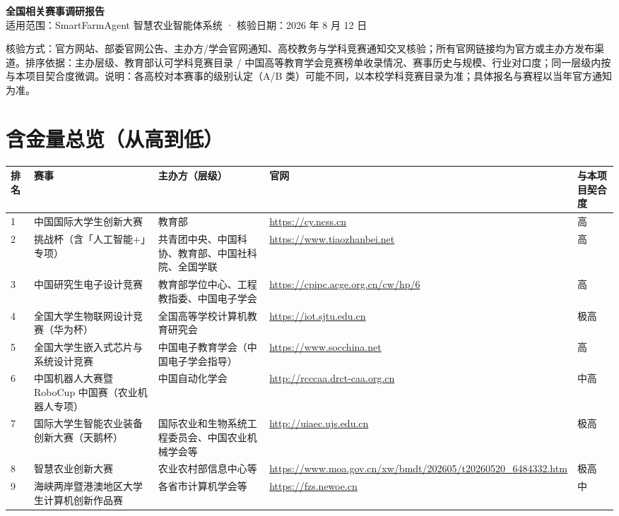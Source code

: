 \documentclass[11pt]{ctexart}
\begin{document}
\begin{center}
  {\LARGE\bfseries 全国相关赛事调研报告}\\[6pt]
  {\normalsize 适用范围：SmartFarmAgent 智慧农业智能体系统 · 核验日期：2026 年 8 月 12 日}
\end{center}

\vspace{0.6em}

核验方式：官方网站、部委官网公告、主办方/学会官网通知、高校教务与学科竞赛通知交叉核验；所有官网链接均为官方或主办方发布渠道。排序依据：主办层级、教育部认可学科竞赛目录 / 中国高等教育学会竞赛榜单收录情况、赛事历史与规模、行业对口度；同一层级内按与本项目契合度微调。说明：各高校对本赛事的级别认定（A/B 类）可能不同，以本校学科竞赛目录为准；具体报名与赛程以当年官方通知为准。

\section{含金量总览（从高到低）}
\begin{small}
\begin{longtable}{p{0.8cm}p{3.6cm}p{3.4cm}p{4.0cm}p{2.8cm}}
  \toprule
  排名 & 赛事 & 主办方（层级） & 官网 & 与本项目契合度 \\
  \midrule
  1 & 中国国际大学生创新大赛 & 教育部 & \url{https://cy.ncss.cn} & 高 \\
  2 & 挑战杯（含「人工智能+」专项） & 共青团中央、中国科协、教育部、中国社科院、全国学联 & \url{https://www.tiaozhanbei.net} & 高 \\
  3 & 中国研究生电子设计竞赛 & 教育部学位中心、工程教指委、中国电子学会 & \url{https://cpipc.acge.org.cn/cw/hp/6} & 高 \\
  4 & 全国大学生物联网设计竞赛（华为杯） & 全国高等学校计算机教育研究会 & \url{https://iot.sjtu.edu.cn} & 极高 \\
  5 & 全国大学生嵌入式芯片与系统设计竞赛 & 中国电子教育学会（中国电子学会指导） & \url{https://www.socchina.net} & 高 \\
  6 & 中国机器人大赛暨 RoboCup 中国赛（农业机器人专项） & 中国自动化学会 & \url{http://rcccaa.drct-caa.org.cn} & 中高 \\
  7 & 国际大学生智能农业装备创新大赛（天鹅杯） & 国际农业和生物系统工程委员会、中国农业机械学会等 & \url{http://uiaec.ujs.edu.cn} & 极高 \\
  8 & 智慧农业创新大赛 & 农业农村部信息中心等 & \url{https://www.moa.gov.cn/xw/bmdt/202605/t20260520_6484332.htm} & 极高 \\
  9 & 海峡两岸暨港澳地区大学生计算机创新作品赛 & 各省市计算机学会等 & \url{https://fzs.newoe.cn} & 中 \\
  \bottomrule
\end{longtable}
\end{small}
\end{document}
